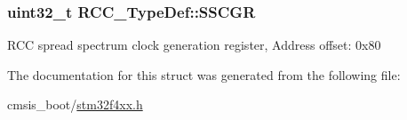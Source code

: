 \subsubsection[{\texorpdfstring{S\+S\+C\+GR}{SSCGR}}]{ uint32\+\_\+t R\+C\+C\+\_\+\+Type\+Def\+::\+S\+S\+C\+GR}\hypertarget{struct_r_c_c___type_def_a52270ad1423c68cd536f62657bb669f5}{}\label{struct_r_c_c___type_def_a52270ad1423c68cd536f62657bb669f5}
R\+CC spread spectrum clock generation register, Address offset\+: 0x80 

The documentation for this struct was generated from the following file\+:\begin{DoxyCompactItemize}
\item 
cmsis\+\_\+boot/\hyperlink{stm32f4xx_8h}{stm32f4xx.\+h}\end{DoxyCompactItemize}
